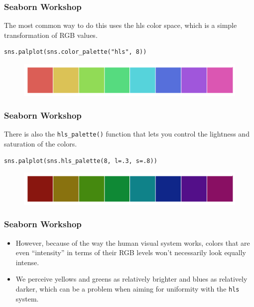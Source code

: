 \documentclass{beamer}
\begin{document}
\begin{frame}[fragile]
	\frametitle{Seaborn Workshop}
	\large
The most common way to do this uses the hls color space, which is a simple transformation of RGB values.

\begin{verbatim}
sns.palplot(sns.color_palette("hls", 8))
\end{verbatim}
\begin{figure}
\centering
\includegraphics[width=0.7\linewidth]{images/color_palettes_10_0}
\caption{}
\label{fig:color_palettes_10_0}
\end{figure}


\end{frame}
\begin{frame}[fragile]
	\frametitle{Seaborn Workshop}
	\large
There is also the \texttt{hls\_palette()} function that lets you control the lightness and saturation of the colors.
\begin{verbatim}
sns.palplot(sns.hls_palette(8, l=.3, s=.8))
\end{verbatim}
\begin{figure}
\centering
\includegraphics[width=0.7\linewidth]{images/color_palettes_12_0}
\end{figure}

\end{frame}
\begin{frame}[fragile]
\frametitle{Seaborn Workshop}
\large
\begin{itemize}
\item However, because of the way the human visual system works, colors that are even “intensity” in terms of their RGB levels won’t necessarily look equally intense.
\item  We perceive yellows and greens as relatively brighter and blues as relatively darker, which can be a problem when aiming for uniformity with the \texttt{hls} system.
\end{itemize}

\end{frame}
\end{document}
